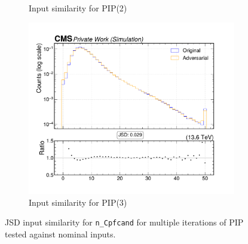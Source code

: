 \begin{figure}[htbp]
\begin{subfigure}[t]{0.32\textwidth}
    \caption{Input similarity for PIP(2)}
  \end{subfigure}\hfill
  \begin{subfigure}[t]{0.32\textwidth}
    \includegraphics[width=\linewidth]{media/output/features/compare/intprob_3/cmp_global_features_n_Cpfcand.pdf}
    \caption{Input similarity for PIP(3)}
  \end{subfigure}

  \caption{JSD input similarity for \texttt{n\_Cpfcand} for multiple iterations of PIP tested against nominal inputs.}
  \label{fig:intprob_input_n_Cpfcand}
\end{figure}
